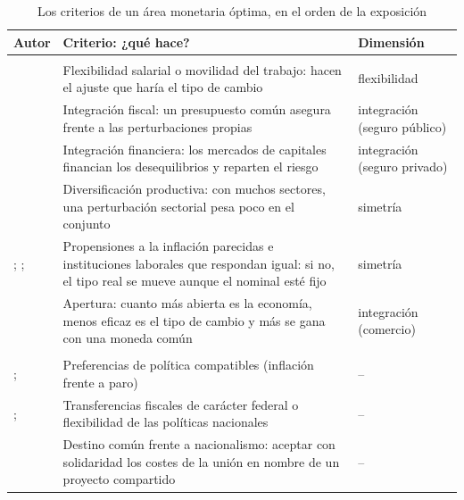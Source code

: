\documentclass[11pt]{article}
\begin{document}
\begin{table}[H]
\centering
\caption{Los criterios de un área monetaria óptima, en el orden de la exposición}\label{tab:criterios}
\small\renewcommand{\arraystretch}{1.25}
\begin{tabular}{>{\raggedright\arraybackslash}m{}>{\raggedright\arraybackslash}m{}>{\centering\arraybackslash}m{}}
\toprule
\textbf{Autor} & \textbf{Criterio: ¿qué hace?} & \textbf{Dimensión}\\
\midrule
\rowcolor{tceeazulpalido}\multicolumn{3}{l}{\textbf{Criterios económicos}}\\
\textcite{Mundell1961Theory} & Flexibilidad salarial o movilidad del trabajo: hacen el ajuste que haría el tipo de cambio & \textcolor{tceeazul}{flexibilidad}\\
\textcite{Kenen1969Theory} & Integración fiscal: un presupuesto común asegura frente a las perturbaciones propias & \textcolor{tceedorado}{integración (seguro público)}\\
\textcite{Ingram1959State,Ingram1973Case} & Integración financiera: los mercados de capitales financian los desequilibrios y reparten el riesgo & \textcolor{tceedorado}{integración (seguro privado)}\\
\textcite{Kenen1969Theory} & Diversificación productiva: con muchos sectores, una perturbación sectorial pesa poco en el conjunto & \textcolor{tceeverde}{simetría}\\
\textcite{Magnifico1971European}; \textcite{BrunoSachs1985Economics}; \textcite{CalmforsDriffill1988} & Propensiones a la inflación parecidas e instituciones laborales que respondan igual: si no, el tipo real se mueve aunque el nominal esté fijo & \textcolor{tceeverde}{simetría}\\
\textcite{McKinnon1963Optimum} & Apertura: cuanto más abierta es la economía, menos eficaz es el tipo de cambio y más se gana con una moneda común & \textcolor{tceedorado}{integración (comercio)}\\
\rowcolor{tceesalmon}\multicolumn{3}{l}{\textbf{Criterios políticos}}\\
\textcite{Corden1972Monetary}; \textcite{DeGrauwe1975Conditions} & Preferencias de política compatibles (inflación frente a paro) & --\\
\textcite{Kenen1969Theory}; \textcite{Oates1972Fiscal} & Transferencias fiscales de carácter federal o flexibilidad de las políticas nacionales & --\\
\textcite{BaldwinWyplosz2020Economics} & Destino común frente a nacionalismo: aceptar con solidaridad los costes de la unión en nombre de un proyecto compartido & --\\
\bottomrule
\end{tabular}
\end{table}
\end{document}
